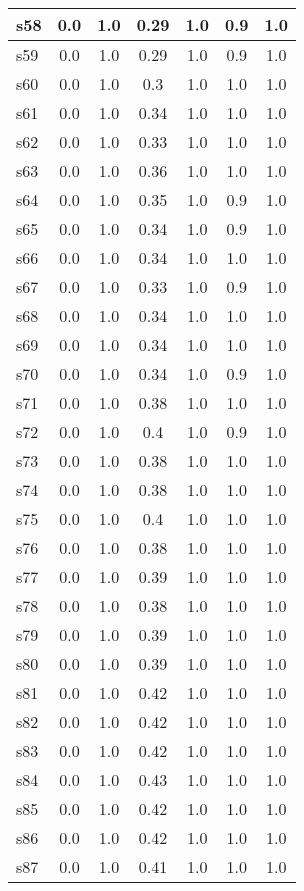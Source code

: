 \documentclass{article}
\begin{document}
\begin{tabular}{|l|c|c|c|c|c|c|}
\hline
s58 &0.0 & 1.0 & 0.29 & 1.0 & 0.9 & 1.0\\
\hline
s59 &0.0 & 1.0 & 0.29 & 1.0 & 0.9 & 1.0\\
\hline
s60 &0.0 & 1.0 & 0.3 & 1.0 & 1.0 & 1.0\\
\hline
s61 &0.0 & 1.0 & 0.34 & 1.0 & 1.0 & 1.0\\
\hline
s62 &0.0 & 1.0 & 0.33 & 1.0 & 1.0 & 1.0\\
\hline
s63 &0.0 & 1.0 & 0.36 & 1.0 & 1.0 & 1.0\\
\hline
s64 &0.0 & 1.0 & 0.35 & 1.0 & 0.9 & 1.0\\
\hline
s65 &0.0 & 1.0 & 0.34 & 1.0 & 0.9 & 1.0\\
\hline
s66 &0.0 & 1.0 & 0.34 & 1.0 & 1.0 & 1.0\\
\hline
s67 &0.0 & 1.0 & 0.33 & 1.0 & 0.9 & 1.0\\
\hline
s68 &0.0 & 1.0 & 0.34 & 1.0 & 1.0 & 1.0\\
\hline
s69 &0.0 & 1.0 & 0.34 & 1.0 & 1.0 & 1.0\\
\hline
s70 &0.0 & 1.0 & 0.34 & 1.0 & 0.9 & 1.0\\
\hline
s71 &0.0 & 1.0 & 0.38 & 1.0 & 1.0 & 1.0\\
\hline
s72 &0.0 & 1.0 & 0.4 & 1.0 & 0.9 & 1.0\\
\hline
s73 &0.0 & 1.0 & 0.38 & 1.0 & 1.0 & 1.0\\
\hline
s74 &0.0 & 1.0 & 0.38 & 1.0 & 1.0 & 1.0\\
\hline
s75 &0.0 & 1.0 & 0.4 & 1.0 & 1.0 & 1.0\\
\hline
s76 &0.0 & 1.0 & 0.38 & 1.0 & 1.0 & 1.0\\
\hline
s77 &0.0 & 1.0 & 0.39 & 1.0 & 1.0 & 1.0\\
\hline
s78 &0.0 & 1.0 & 0.38 & 1.0 & 1.0 & 1.0\\
\hline
s79 &0.0 & 1.0 & 0.39 & 1.0 & 1.0 & 1.0\\
\hline
s80 &0.0 & 1.0 & 0.39 & 1.0 & 1.0 & 1.0\\
\hline
s81 &0.0 & 1.0 & 0.42 & 1.0 & 1.0 & 1.0\\
\hline
s82 &0.0 & 1.0 & 0.42 & 1.0 & 1.0 & 1.0\\
\hline
s83 &0.0 & 1.0 & 0.42 & 1.0 & 1.0 & 1.0\\
\hline
s84 &0.0 & 1.0 & 0.43 & 1.0 & 1.0 & 1.0\\
\hline
s85 &0.0 & 1.0 & 0.42 & 1.0 & 1.0 & 1.0\\
\hline
s86 &0.0 & 1.0 & 0.42 & 1.0 & 1.0 & 1.0\\
\hline
s87 &0.0 & 1.0 & 0.41 & 1.0 & 1.0 & 1.0\\

\end{tabular}
\end{document}
